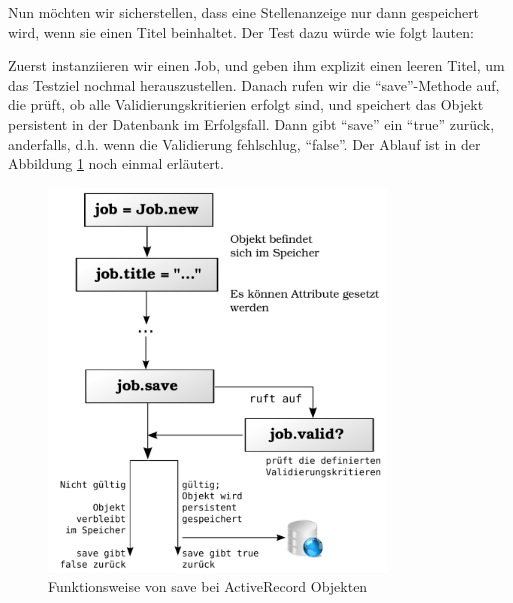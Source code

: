 Nun möchten wir sicherstellen, dass eine Stellenanzeige nur dann gespeichert wird, wenn sie einen Titel beinhaltet. Der Test dazu würde wie folgt lauten:

\begin{ruby}[label={test/units/job\_test.rb}]
 

   
    
      
      
     
\end{ruby}
\tddred
Zuerst instanziieren wir einen Job, und geben ihm explizit einen leeren Titel, um das Testziel nochmal herauszustellen. Danach rufen wir die "`save"'-Methode auf, die prüft, ob alle Validierungskritierien erfolgt sind, und speichert das Objekt persistent in der Datenbank im Erfolgsfall. Dann gibt "`save"' ein "`true"' zurück, anderfalls, d.h. wenn die Validierung fehlschlug, "`false"'.
Der Ablauf ist in der Abbildung \ref{fig:activerecordsave} noch einmal erläutert.

\begin{figure}[hbp]
 \centering
 \includegraphics[width=0.8\textwidth]{./diagrams/activerecord-save.pdf}
 \caption{Funktionsweise von save bei ActiveRecord Objekten}
 \label{fig:activerecordsave}
\end{figure}

